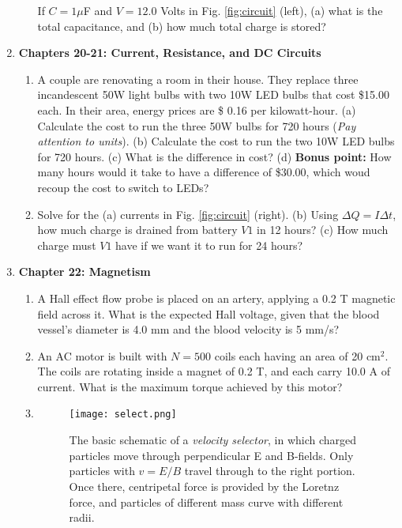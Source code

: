 \documentclass[10pt]{article}
\begin{document}
\begin{enumerate}
\begin{enumerate}
If $C = 1\mu$F and $V = 12.0$ Volts in Fig. \ref{fig:circuit} (left), (a) what is the total capacitance, and (b) how much total charge is stored? \\ \vspace{1.5cm}
\end{enumerate}
\item \textbf{Chapters 20-21: Current, Resistance, and DC Circuits}
\begin{enumerate}
\item A couple are renovating a room in their house.  They replace three incandescent 50W light bulbs with two 10W LED bulbs that cost \$15.00 each.  In their area, energy prices are \$ 0.16 per kilowatt-hour.  (a) Calculate the cost to run the three 50W bulbs for 720 hours (\textit{Pay attention to units}).  (b) Calculate the cost to run the two 10W LED bulbs for 720 hours.  (c) What is the difference in cost? (d) \textbf{Bonus point:} How many hours would it take to have a difference of \$30.00, which woud recoup the cost to switch to LEDs? \\ \vspace{2cm}
\item Solve for the (a) currents in Fig. \ref{fig:circuit} (right). (b) Using $\Delta Q = I \Delta t$, how much charge is drained from battery $V1$ in 12 hours? (c) How much charge must $V1$ have if we want it to run for 24 hours? \\ \vspace{6cm} 
\end{enumerate}
\item \textbf{Chapter 22: Magnetism}
\begin{enumerate}
\item A Hall effect flow probe is placed on an artery, applying a 0.2 T magnetic field across it. What is the expected Hall voltage, given that the blood vessel's diameter is 4.0 mm and the blood velocity is 5 mm/s? \\ \vspace{1cm}
\item An AC motor is built with $N=500$ coils each having an area of 20 cm$^2$.  The coils are rotating inside a magnet of 0.2 T, and each carry 10.0 A of current.  What is the maximum torque achieved by this motor? \\ \vspace{2cm}
\item
\begin{figure}
\centering
\texttt{[image: select.png]}
\caption{\label{fig:selector} The basic schematic of a \textit{velocity selector}, in which charged particles move through perpendicular E and B-fields. Only particles with $v = E/B$ travel through to the right portion.  Once there, centripetal force is provided by the Loretnz force, and particles of different mass curve with different radii.}

\end{figure}
\end{enumerate}
\end{enumerate}
\end{document}

